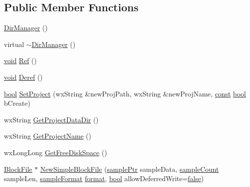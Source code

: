 \subsection*{Public Member Functions}
\begin{DoxyCompactItemize}
\item 
\hyperlink{class_dir_manager_af4ac217c628de785d0c6294882e44173}{Dir\+Manager} ()
\item 
virtual \hyperlink{class_dir_manager_af376da6996107c4e212ee47915fa4e9d}{$\sim$\+Dir\+Manager} ()
\item 
\hyperlink{sound_8c_ae35f5844602719cf66324f4de2a658b3}{void} \hyperlink{class_dir_manager_a0021fa0d115f9751ba352812e8e23b16}{Ref} ()
\item 
\hyperlink{sound_8c_ae35f5844602719cf66324f4de2a658b3}{void} \hyperlink{class_dir_manager_a496ce0b8a108560c43a912cecc2cbec9}{Deref} ()
\item 
\hyperlink{mac_2config_2i386_2lib-src_2libsoxr_2soxr-config_8h_abb452686968e48b67397da5f97445f5b}{bool} \hyperlink{class_dir_manager_a5769734b1e7c91ed1a2a41c55463dd41}{Set\+Project} (wx\+String \&new\+Proj\+Path, wx\+String \&new\+Proj\+Name, \hyperlink{getopt1_8c_a2c212835823e3c54a8ab6d95c652660e}{const} \hyperlink{mac_2config_2i386_2lib-src_2libsoxr_2soxr-config_8h_abb452686968e48b67397da5f97445f5b}{bool} b\+Create)
\item 
wx\+String \hyperlink{class_dir_manager_a48fbc0b9327fdbcad0486eaba94f27db}{Get\+Project\+Data\+Dir} ()
\item 
wx\+String \hyperlink{class_dir_manager_a61ad92e996a1477027e489bc03c07573}{Get\+Project\+Name} ()
\item 
wx\+Long\+Long \hyperlink{class_dir_manager_a945857fae9516edc596a3bdcf3ba139a}{Get\+Free\+Disk\+Space} ()
\item 
\hyperlink{class_block_file}{Block\+File} $\ast$ \hyperlink{class_dir_manager_aa266307a85c575953e6e83954e7d7007}{New\+Simple\+Block\+File} (\hyperlink{include_2audacity_2_types_8h_aaafb46d1caf7c79262fec96b577215fe}{sample\+Ptr} sample\+Data, \hyperlink{include_2audacity_2_types_8h_afa427e1f521ea5ec12d054e8bd4d0f71}{sample\+Count} sample\+Len, \hyperlink{include_2audacity_2_types_8h_a9938d2e2f6adef23e745cd80ef379792}{sample\+Format} \hyperlink{_export_p_c_m_8cpp_a317afff57d87a89158c2b038d37b2b08}{format}, \hyperlink{mac_2config_2i386_2lib-src_2libsoxr_2soxr-config_8h_abb452686968e48b67397da5f97445f5b}{bool} allow\+Deferred\+Write=\hyperlink{mac_2config_2i386_2lib-src_2libsoxr_2soxr-config_8h_a65e9886d74aaee76545e83dd09011727}{false})

\end{DoxyCompactItemize}
